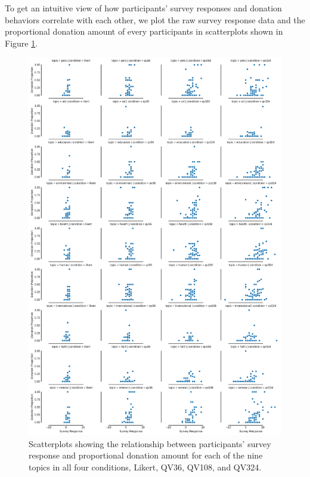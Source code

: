 To get an intuitive view of how participants' survey responses and donation behaviors correlate with each other, we plot the raw survey response data and the proportional donation amount of every participants in scatterplots shown in Figure \ref{fig:topic_covariate_exp1}. {}

\begin{figure}[htpb]
    \centering
    \includegraphics[width=\textwidth, keepaspectratio=true]{content/image/vote_donation_covariates.pdf}
    \caption{
      Scatterplots showing the relationship between participants' survey response and proportional donation amount for each of the nine topics in all four conditions, Likert, QV36, QV108, and QV324. 
    }
    \label{fig:topic_covariate_exp1}
\end{figure}


